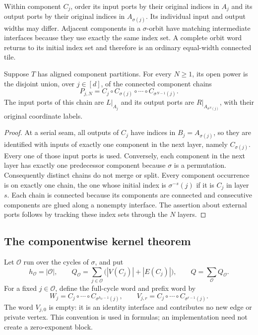Within component $C_j$, order its input ports by their original indices in
$A_j$ and its output ports by their original indices in $A_{\sigma(j)}$.
Its individual input and output widths may differ.  Adjacent components in a
$\sigma$-orbit have matching intermediate interfaces because they use exactly
the same index set.  A complete orbit word returns to its initial index set
and therefore is an ordinary equal-width connected tile.

\begin{lemma}
\label{lem:route-chains}
Suppose $T$ has aligned component partitions.  For every $N\geq1$, its open
power is the disjoint union, over $j\in[d]$, of the connected component chains
\[
 P_{j,N}=C_j\circ C_{\sigma(j)}\circ\cdots\circ C_{\sigma^{N-1}(j)}.
\]
The input ports of this chain are $L|_{A_j}$ and its output ports are
$R|_{A_{\sigma^N(j)}}$, with their original coordinate labels.
\end{lemma}

\begin{proof}
At a serial seam, all outputs of $C_j$ have indices in $B_j=A_{\sigma(j)}$,
so they are identified with inputs of exactly one component in the next layer,
namely $C_{\sigma(j)}$.  Every one of those input ports is used.  Conversely,
each component in the next layer has exactly one predecessor component because
$\sigma$ is a permutation.  Consequently distinct chains do not merge or split.
Every component occurrence is on exactly one chain, the one whose initial
index is $\sigma^{-s}(j)$ if it is $C_j$ in layer $s$.  Each chain is connected
because its components are connected and consecutive components are glued
along a nonempty interface.  The assertion about external ports follows by
tracking these index sets through the $N$ layers.
\end{proof}

\subsection{The componentwise kernel theorem}

Let $\mathcal O$ run over the cycles of $\sigma$, and put
\[
 h_{\mathcal O}=|\mathcal O|,\qquad
 Q_{\mathcal O}=\sum_{j\in\mathcal O}
       \bigl(|V(C_j)|+|E(C_j)|\bigr),\qquad
 Q=\sum_{\mathcal O}Q_{\mathcal O}.
\]
For a fixed $j\in\mathcal O$, define the full-cycle word and prefix word by
\[
 W_j=C_j\circ\cdots\circ C_{\sigma^{h_{\mathcal O}-1}(j)},
 \qquad
 V_{j,r}=C_j\circ\cdots\circ C_{\sigma^{r-1}(j)}.
\]
The word $V_{j,0}$ is empty: it is an identity interface and contributes no
new edge or private vertex.  This convention is used in formulas; an
implementation need not create a zero-exponent block.

